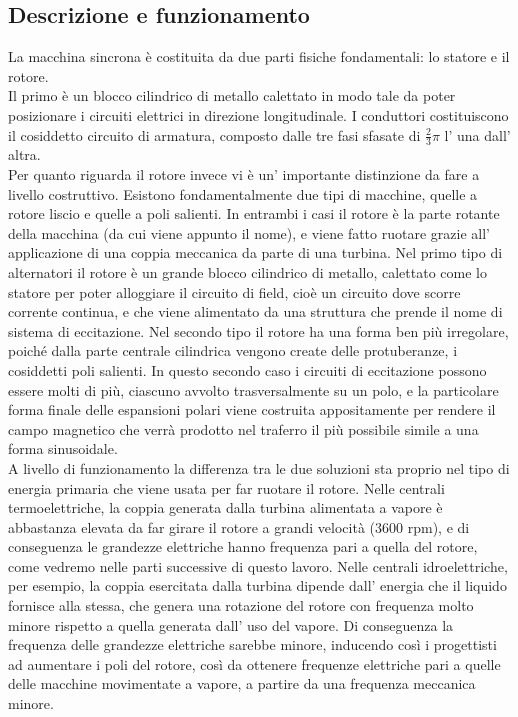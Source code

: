 \documentclass[Lau,noexaminfo]{sapthesis}
\begin{document}
	\subsection{Descrizione e funzionamento}
	La macchina sincrona è costituita da due parti fisiche fondamentali: lo statore e il rotore.\\
	Il primo è un blocco cilindrico di metallo calettato in modo tale da poter posizionare i circuiti elettrici in direzione longitudinale. I conduttori costituiscono il cosiddetto circuito di armatura, composto dalle tre fasi sfasate di $\frac{2}{3}\pi$ l' una dall' altra.\\
	Per quanto riguarda il rotore invece vi è un' importante distinzione da fare a livello costruttivo. Esistono fondamentalmente due tipi di macchine, quelle a rotore liscio e quelle a poli salienti. In entrambi i casi il rotore è la parte rotante della macchina (da cui viene appunto il nome), e viene fatto ruotare grazie all' applicazione di una coppia meccanica da parte di una turbina. Nel primo tipo di alternatori il rotore è un grande blocco cilindrico di metallo, calettato come lo statore per poter alloggiare il circuito di field, cioè un circuito dove scorre corrente continua, e che viene alimentato da una struttura che prende il nome di sistema di eccitazione. Nel secondo tipo il rotore ha una forma ben più irregolare, poiché dalla parte centrale cilindrica vengono create delle protuberanze, i cosiddetti poli salienti. In questo secondo caso i circuiti di eccitazione possono essere molti di più, ciascuno avvolto trasversalmente su un polo, e la particolare forma finale delle espansioni polari viene costruita appositamente per rendere il campo magnetico che verrà prodotto nel traferro il più possibile simile a una forma sinusoidale.\\
	A livello di funzionamento la differenza tra le due soluzioni sta proprio nel tipo di energia primaria che viene usata per far ruotare il rotore. Nelle centrali termoelettriche, la coppia generata dalla turbina alimentata a vapore è abbastanza elevata da far girare il rotore a grandi velocità (3600 rpm), e di conseguenza le grandezze elettriche hanno frequenza pari a quella del rotore, come vedremo nelle parti successive di questo lavoro. Nelle centrali idroelettriche, per esempio, la coppia esercitata dalla turbina dipende dall' energia che il liquido fornisce alla stessa, che genera una rotazione del rotore con frequenza molto minore rispetto a quella generata dall' uso del vapore. Di conseguenza la frequenza delle grandezze elettriche sarebbe minore, inducendo così i progettisti ad aumentare i poli del rotore, così da ottenere frequenze elettriche pari a quelle delle macchine movimentate a vapore, a partire da una frequenza meccanica minore.\\\\\\
\end{document}

